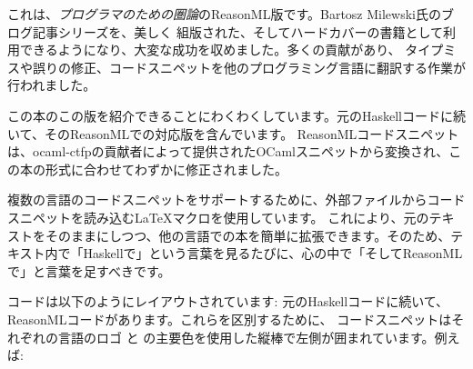 
\lettrine[lhang=0.17]{こ}{れは}、\emph{プログラマのための圏論}のReasonML版です。Bartosz Milewski氏のブログ記事シリーズを、美しく
組版された、そしてハードカバーの書籍として利用できるようになり、大変な成功を収めました。多くの貢献があり、
タイプミスや誤りの修正、コードスニペットを他のプログラミング言語に翻訳する作業が行われました。

この本のこの版を紹介できることにわくわくしています。元のHaskellコードに続いて、そのReasonMLでの対応版を含んでいます。
ReasonMLコードスニペットは、ocaml-ctfpの貢献者によって提供されたOCamlスニペットから変換され、この本の形式に合わせてわずかに修正されました。

複数の言語のコードスニペットをサポートするために、外部ファイルからコードスニペットを読み込む\LaTeX{}マクロを使用しています。
これにより、元のテキストをそのままにしつつ、他の言語での本を簡単に拡張できます。そのため、テキスト内で「Haskellで」という言葉を見るたびに、心の中で「そしてReasonMLで」と言葉を足すべきです。

コードは以下のようにレイアウトされています: 元のHaskellコードに続いて、ReasonMLコードがあります。これらを区別するために、
コードスニペットはそれぞれの言語のロゴ  と  の主要色を使用した縦棒で左側が囲まれています。例えば: 

\unskip
{}
\NoIndentAfterThis
